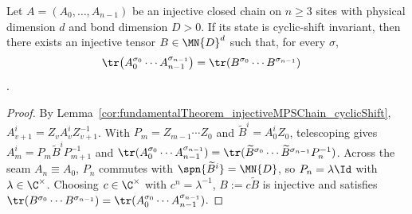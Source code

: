 \begin{lemma}%
    \label{cor:exists_constant_injectiveMPS_of_cyclicShiftInvariantState}
    \leanok
    Let $A=(A_0,\ldots,A_{n-1})$ be an injective closed chain on $n\ge 3$ sites
    with physical dimension $d$ and bond dimension $D>0$. If its state is
    cyclic-shift invariant, then there exists an injective tensor
    $B\in\MN{D}^d$ such that, for every $\sigma$,
    \begin{align}
        \tr\!\left(A_0^{\sigma_0}\cdots A_{n-1}^{\sigma_{n-1}}\right)
         & =
        \tr\!\left(B^{\sigma_0}\cdots B^{\sigma_{n-1}}\right)
        \notag
    \end{align}
    \cite[lines~1803--1890]{Molnar2018NormalPEPS}.
\end{lemma}
\begin{proof}\leanok
    By Lemma~\ref{cor:fundamentalTheorem_injectiveMPSChain_cyclicShift},
    $A_{v+1}^i=Z_v A_v^i Z_{v+1}^{-1}$. With $P_m=Z_{m-1}\cdots Z_0$ and
    $\widetilde B^i=A_0^i Z_0$, telescoping gives
    $A_m^i=P_m \widetilde B^i P_{m+1}^{-1}$ and
    $\tr(A_0^{\sigma_0}\cdots A_{n-1}^{\sigma_{n-1}})=\tr(\widetilde B^{\sigma_0}\cdots\widetilde B^{\sigma_{n-1}}P_n^{-1})$.
    Across the seam $A_n\equiv A_0$, $P_n$ commutes with $\spn\{\widetilde B^i\}=\MN{D}$,
    so $P_n=\lambda\Id$ with $\lambda\in\C^\times$. Choosing $c\in\C^\times$
    with $c^n=\lambda^{-1}$, $B:=c\widetilde B$ is injective and satisfies
    $\tr(B^{\sigma_0}\cdots B^{\sigma_{n-1}})=\tr(A_0^{\sigma_0}\cdots A_{n-1}^{\sigma_{n-1}})$.
\end{proof}

